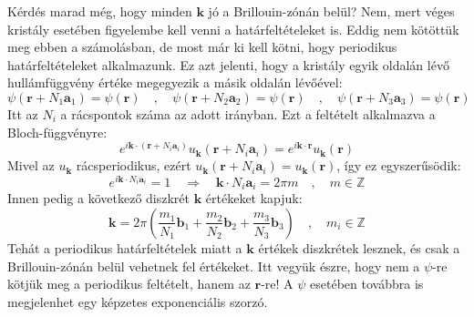 \documentclass[../main.tex]{subfiles}
\begin{document}
Kérdés marad még, hogy minden $\mathbf{k}$ jó a Brillouin-zónán belül? Nem, mert véges kristály esetében figyelembe kell venni a határfeltételeket is. Eddig nem kötöttük meg ebben a számolásban,
de most már ki kell kötni, hogy periodikus határfeltételeket alkalmazunk. Ez azt jelenti, hogy a kristály egyik oldalán lévő hullámfüggvény értéke megegyezik a másik oldalán lévőével:
\begin{equation}
    \psi (\mathbf{r} + N_1 \mathbf{a}_1) = \psi (\mathbf{r}) \quad , \quad \psi (\mathbf{r} + N_2 \mathbf{a}_2) = \psi (\mathbf{r}) \quad , \quad \psi (\mathbf{r} + N_3 \mathbf{a}_3) = \psi (\mathbf{r})
\end{equation}
Itt az $N_i$ a rácspontok száma az adott irányban. Ezt a feltételt alkalmazva a Bloch-függvényre:
\begin{equation}
    e^{i \mathbf{k} \cdot (\mathbf{r} + N_i \mathbf{a}_i)} u_\mathbf{k} (\mathbf{r} + N_i \mathbf{a}_i) = e^{i \mathbf{k} \cdot \mathbf{r}} u_\mathbf{k} (\mathbf{r})
\end{equation}
Mivel az $u_\mathbf{k}$ rácsperiodikus, ezért $u_\mathbf{k} (\mathbf{r} + N_i \mathbf{a}_i) = u_\mathbf{k} (\mathbf{r})$, így ez egyszerűsödik:
\begin{equation}
    e^{i \mathbf{k} \cdot N_i \mathbf{a}_i} = 1 \quad \Rightarrow \quad \mathbf{k} \cdot N_i \mathbf{a}_i = 2 \pi m \quad , \quad m \in \mathbb{Z}
\end{equation}
Innen pedig a következő diszkrét $\mathbf{k}$ értékeket kapjuk:
\begin{equation}
    \mathbf{k} = 2 \pi \left(\frac{m_1}{N_1} \mathbf{b}_1 + \frac{m_2}{N_2} \mathbf{b}_2 + \frac{m_3}{N_3} \mathbf{b}_3\right) \quad , \quad m_i \in \mathbb{Z}
\end{equation}
Tehát a periodikus határfeltételek miatt a $\mathbf{k}$ értékek diszkrétek lesznek, és csak a Brillouin-zónán belül vehetnek fel értékeket. Itt vegyük észre, hogy nem
a $\psi$-re kötjük meg a periodikus feltételt, hanem az $\mathbf{r}$-re! A $\psi$ esetében továbbra is megjelenhet egy képzetes exponenciális szorzó.
\end{document}
